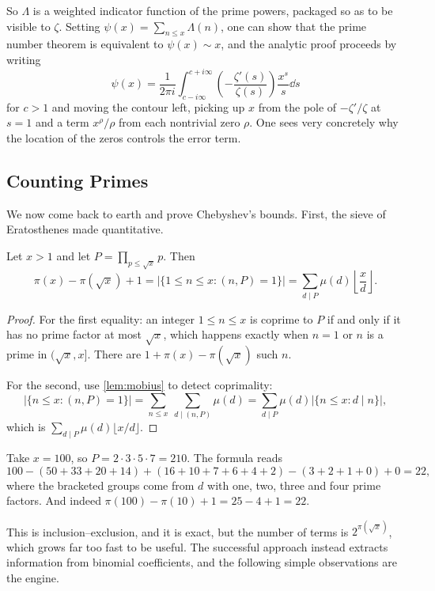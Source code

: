So $\Lambda$ is a weighted indicator function of the prime powers, packaged so as to be visible to $\zeta$. Setting $\psi(x) = \sum_{n \leq x}\Lambda(n)$, one can show that the prime number theorem is equivalent to $\psi(x) \sim x$, and the analytic proof proceeds by writing
$$
\psi(x) = \frac1{2\pi i}\int_{c - i\infty}^{c+i\infty}\left(-\frac{\zeta'(s)}{\zeta(s)}\right)\frac{x^s}s\dd s
$$
for $c > 1$ and moving the contour left, picking up $x$ from the pole of $-\zeta'/\zeta$ at $s = 1$ and a term $x^\rho/\rho$ from each nontrivial zero $\rho$. One sees very concretely why the location of the zeros controls the error term.

\subsection{Counting Primes}

We now come back to earth and prove Chebyshev's bounds. First, the sieve of Eratosthenes made quantitative.

\begin{proposition}
	Let $x > 1$ and let $P = \prod_{p \leq \sqrt x}p$. Then
	$$
	\pi(x) - \pi(\sqrt x) + 1 = \left|\{1 \leq n \leq x : (n, P) = 1\}\right| = \sum_{d \mid P}\mu(d)\left\lfloor\frac xd\right\rfloor.
	$$
\end{proposition}
\begin{proof}
	For the first equality: an integer $1 \leq n \leq x$ is coprime to $P$ if and only if it has no prime factor at most $\sqrt x$, which happens exactly when $n = 1$ or $n$ is a prime in $(\sqrt x, x]$. There are $1 + \pi(x) - \pi(\sqrt x)$ such $n$.

	For the second, use \autoref{lem:mobius} to detect coprimality:
	$$
	\left|\{n \leq x : (n,P) = 1\}\right| = \sum_{n \leq x}\ \sum_{d \mid (n, P)}\mu(d) = \sum_{d \mid P}\mu(d)\left|\{n \leq x : d \mid n\}\right|,
	$$
	which is $\sum_{d\mid P}\mu(d)\lfloor x/d\rfloor$.
\end{proof}

\begin{example}
	Take $x = 100$, so $P = 2\cdot3\cdot5\cdot7 = 210$. The formula reads
	$$
	100 - \left(50 + 33 + 20 + 14\right) + \left(16 + 10 + 7 + 6 + 4 + 2\right) - \left(3 + 2 + 1 + 0\right) + 0 = 22,
	$$
	where the bracketed groups come from $d$ with one, two, three and four prime factors. And indeed $\pi(100) - \pi(10) + 1 = 25 - 4 + 1 = 22$.
\end{example}

This is inclusion--exclusion, and it is exact, but the number of terms is $2^{\pi(\sqrt x)}$, which grows far too fast to be useful. The successful approach instead extracts information from binomial coefficients, and the following simple observations are the engine.

